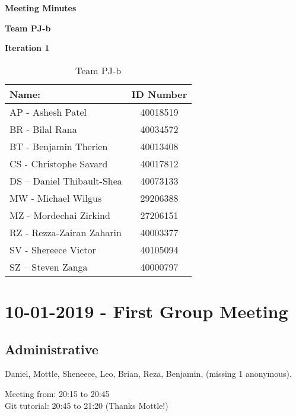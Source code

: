 \documentclass[12pt]{article}
\begin{document}
	
	\vspace*{0.5in}
	\centerline{\bf\Large Meeting Minutes }
	
	\vspace*{0.5in}
	\centerline{\bf\Large Team PJ-b}
	\vspace*{0.25in}
	\centerline{\bf\Large Iteration 1}
	
	
	\vspace*{1.5in}
	\begin{table}[htbp]
		\caption{Team PJ-b}
		\begin{center}
			\begin{tabular}{|l | c|}
				\hline
				Name: & ID Number \\
				\hline
				AP - Ashesh Patel & 40018519 \\
				\hline
				BR - Bilal Rana & 40034572 \\
				\hline
				BT - Benjamin Therien & 40013408 \\
				\hline
				CS - Christophe Savard & 40017812 \\
				\hline
				DS – Daniel Thibault-Shea & 40073133 \\
				\hline
				MW - Michael Wilgus & 29206388 \\
				\hline
				MZ - Mordechai Zirkind & 27206151 \\
				\hline
				RZ - Rezza-Zairan Zaharin & 40003377 \\
				\hline
				SV - Shereece Victor & 40105094 \\
				\hline
				SZ – Steven Zanga & 40000797 \\
				\hline
			\end{tabular}
		\end{center}
	\end{table}
	
	\clearpage
	
	\section{10-01-2019 - First Group Meeting}
	
	\subsection{Administrative}
	Daniel, Mottle, Sheneece, Leo, Brian, Reza, Benjamin, (missing 1 anonymous).
	
	Meeting from: 20:15 to 20:45\\
	Git tutorial: 20:45 to 21:20 (Thanks Mottle!)
	
\end{document}
